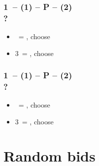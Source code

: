 \documentclass[12pt, a4paper]{article}
\begin{document}
\subsubsection*{1\diams\ -- (1\spades) -- P -- (2\spades) \\ ?}
\begin{itemize}
    \item \dbl\ = \diams\hearts, choose
    \item 3\clubs\ = \clubs\diams, choose
\end{itemize}

\subsubsection*{1\diams\ -- (1\hearts) -- P -- (2\hearts) \\ ?}
\begin{itemize}
    \item \dbl\ = \diams\spades, choose
    \item 3\clubs\ = \clubs\diams, choose
\end{itemize}



\section{Random bids}
\end{document}
